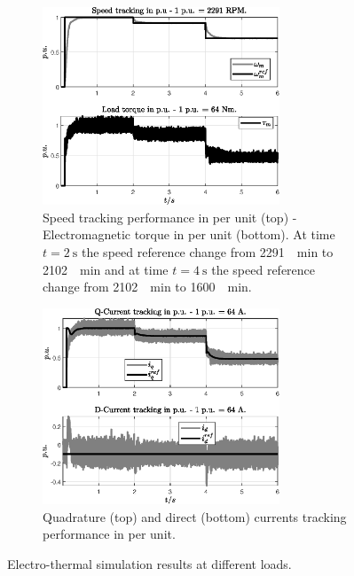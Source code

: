 \documentclass[11pt,a4paper,oneside]{book}
\numberwithin{equation}{section}
\theoremstyle{it}
\theoremstyle{definition}
\begin{document}
\begin{figure}[H]
	\centering
	\begin{subfigure}{0.5\textwidth}
		\centering
		\includegraphics[width = 200pt, angle = 0, 
		keepaspectratio]{figures/thermal_analysis/case_1/sim_results_fig_1.eps}
		\captionsetup{width=0.85\textwidth, font=footnotesize}	
		\caption{Speed tracking performance in per unit (top) - Electromagnetic torque in per unit (bottom). At time $t=\SI{2}{\second}$ the speed reference change from \SI{2291}{\per\minute} to \SI{2102}{\per\minute} and at time $t=\SI{4}{\second}$ the speed reference change from \SI{2102}{\per\minute} to \SI{1600}{\per\minute}.}
		\label{}
	\end{subfigure}%
	\begin{subfigure}{.5\textwidth}
		\centering
		\includegraphics[width = 200pt, angle = 0, 
		keepaspectratio]{figures/thermal_analysis/case_1/sim_results_fig_2.eps}
		\captionsetup{width=0.85\textwidth, font=footnotesize}	
		\caption{Quadrature (top) and direct (bottom) currents tracking performance in per unit.\vspace{11mm}}
		\label{}
	\end{subfigure}
	\captionsetup{width=0.5\textwidth, font=small}	
	\caption{Electro-thermal simulation results at different loads.}
	\label{}
\end{figure}
\end{document}
